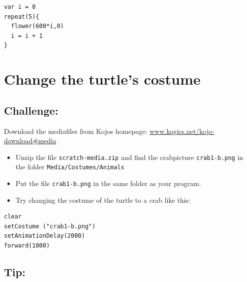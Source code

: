 \begin{lstlisting}[basicstyle={\ttfamily\fontsize{18}{22}\selectfont},numbers=none]
var i = 0          
repeat(5){
  flower(600*i,0)
  i = i + 1        
}
\end{lstlisting}
        
\chapter{Change the turtle's costume}\section*{\color{BrickRed}Challenge:}
Download the mediafiles from Kojos homepage:
\href{http://www.kogics.net/kojo-download#media}{www.kogics.net/kojo-download\#media}


\begin{itemize}

\item {Unzip the file \lstinline{scratch-media.zip} and find the crabpicture \lstinline{crab1-b.png} in the folder \lstinline{Media/Costumes/Animals}}
\item {Put the file \lstinline{crab1-b.png} in the same folder as your program.}
\item {Try changing the costume of the turtle to a crab like this:}

\end{itemize}



  

\begin{lstlisting}[basicstyle={\ttfamily\fontsize{20}{24}\selectfont},numbers=none]
clear
setCostume ("crab1-b.png")  
setAnimationDelay(2000)
forward(1000)
\end{lstlisting}
        
\section*{\color{OliveGreen}Tip:}


